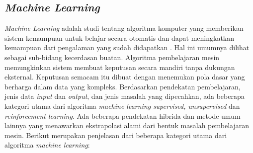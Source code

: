 \subsection{\textit{Machine Learning}}
\label{subsec:machine-learning}

\textit{Machine Learning} adalah studi tentang algoritma komputer yang memberikan sistem kemampuan untuk belajar secara otomatis dan dapat meningkatkan kemampuan dari pengalaman yang sudah didapatkan \citep{machinelearning1}. Hal ini umumnya dilihat sebagai sub-bidang kecerdasan buatan. Algoritma pembelajaran mesin memungkinkan sistem membuat keputusan secara mandiri tanpa dukungan eksternal. Keputusan semacam itu dibuat dengan menemukan pola dasar yang berharga dalam data yang kompleks. Berdasarkan pendekatan pembelajaran, jenis data \textit{input} dan \textit{output}, dan jenis masalah yang dipecahkan, ada beberapa kategori utama dari algoritma \textit{machine learning} \textit{supervised, unsupervised} dan \textit{reinforcement learning}. Ada beberapa pendekatan hibrida dan metode umum lainnya yang menawarkan ekstrapolasi alami dari bentuk masalah pembelajaran mesin. Berikut merupakan penjelasan dari beberapa kategori utama dari algoritma \textit{machine learning}:


